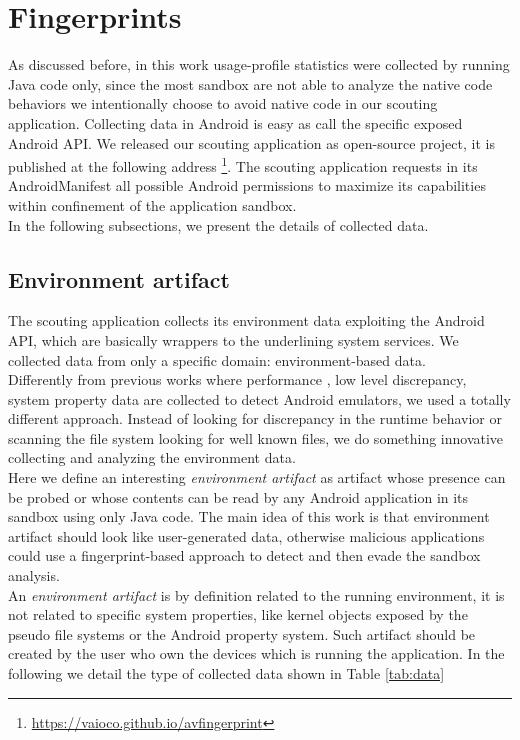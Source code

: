 \section{Fingerprints}
\label{sec:implementation}
As discussed before, in this work usage-profile statistics were collected by running  Java code only, since the most sandbox are not able to analyze the native code behaviors we intentionally choose to avoid native code in our scouting application. Collecting data in Android is easy as call the specific exposed Android API. We released our scouting application as open-source project, it is published at the following address \footnote{\url{https://vaioco.github.io/avfingerprint}}.
The scouting application requests in its AndroidManifest all possible Android permissions to maximize its capabilities within confinement of the application sandbox. \\
In the following subsections, we present the details of collected data.

\subsection{Environment artifact}
The scouting application collects its environment data exploiting the Android API, which are basically wrappers to the underlining system services. We collected data from only a specific domain: environment-based data. \\  
Differently from previous works \cite{petsas2014rage}\cite{vidas2014evading}\cite{jing2014morpheus} where performance , low level discrepancy, system property data are collected to detect Android emulators, we used a totally different approach. Instead of looking for discrepancy in the runtime behavior or scanning the file system looking for well known files, we do something innovative collecting and analyzing the environment data. \\
Here we define an interesting \textit{environment artifact} as artifact whose presence can be probed or whose contents can be read by any Android application in its sandbox using only Java code.
The main idea of this work is that environment artifact should look like user-generated data, otherwise malicious applications could use a fingerprint-based approach to detect and then evade the sandbox analysis. \\
An \textit{environment artifact} is by definition related to the running environment, it is not related to specific system properties, like kernel objects exposed by the pseudo file systems or the Android property system. Such artifact should be created by the user who own the devices which is running the application.
In the following we detail the type of collected data shown in Table \ref{tab:data}

